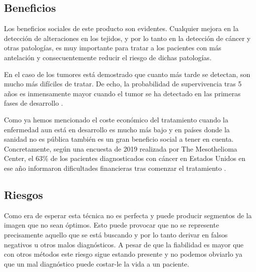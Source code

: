     \subsection{Beneficios}
    Los beneficios sociales de este producto son evidentes. Cualquier mejora en la detección de alteraciones en los tejidos, y por lo tanto en la detección de cáncer y otras patologías, es muy importante para tratar a los pacientes con más antelación y consecuentemente reducir el riesgo de dichas patologías.
    
    En el caso de los tumores está demostrado que cuanto más tarde se detectan, son mucho más difíciles de tratar. De echo, la probabilidad de supervivencia tras 5 años es inmensamente mayor cuando el tumor se ha detectado en las primeras fases de desarrollo \cite{noauthor_diagnostico_nodate}.
    
    Como ya hemos mencionado el coste económico del tratamiento cuando la enfermedad aun está en desarrollo es mucho más bajo y en países donde la sanidad no es pública también es un gran beneficio social a tener en cuenta. Concretamente, según una encuesta de 2019 realizada por The Mesothelioma Center, el 63\% de los pacientes diagnosticados con cáncer en Estados Unidos en ese año informaron dificultades financieras tras comenzar el tratamiento \cite{noauthor_americans_nodate}.
    
    \subsection{Riesgos}
    
    Como era de esperar esta técnica no es perfecta y puede producir segmentos de la imagen que no sean óptimos. Esto puede provocar que no se represente precisamente aquello que se está buscando y por lo tanto derivar en falsos negativos u otros malos diagnósticos. A pesar de que la fiabilidad es mayor que con otros métodos este riesgo sigue estando presente y no podemos obviarlo ya que un mal diagnóstico puede costar-le la vida a un paciente.
\pagebreak

\sloppy
\printbibliography






